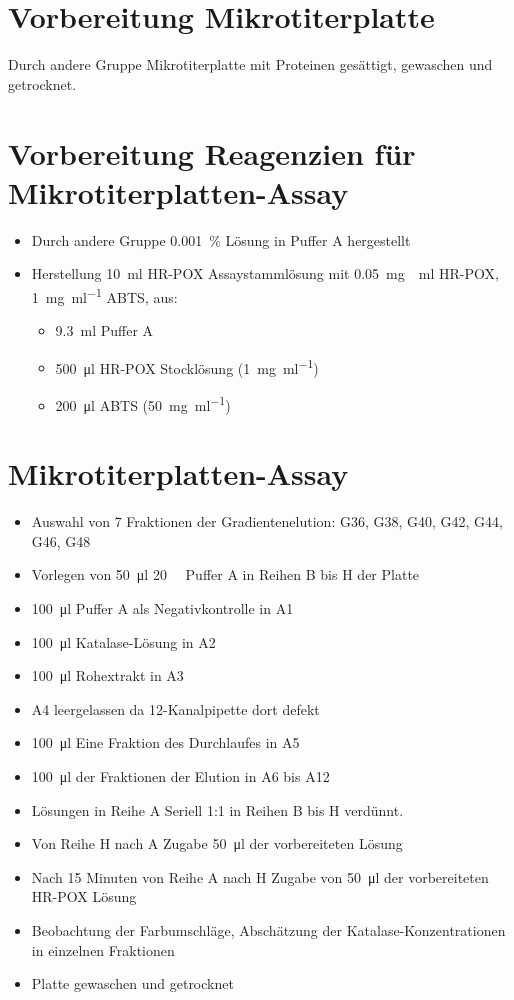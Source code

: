 \documentclass[a4paper,german]{scrreprt}
\begin{document}
\section{Vorbereitung Mikrotiterplatte}

Durch andere Gruppe Mikrotiterplatte mit Proteinen gesättigt, gewaschen und
getrocknet.

\section{Vorbereitung Reagenzien für Mikrotiterplatten-Assay}

\begin{itemize}
	\item Durch andere Gruppe \SI{0.001}{\percent}  Lösung in Puffer A hergestellt
	\item Herstellung \SI{10}{ml} HR-POX Assaystammlösung mit \SI{0.05}{\mg
		\per \ml} HR-POX, \SI{1}{\mg \per \ml} ABTS, aus:
		\begin{itemize}
			\item \SI{9.3}{\ml} Puffer A
			\item \SI{500}{\ul} HR-POX Stocklösung (\SI{1}{\mg \per \ml})
			\item \SI{200}{\ul} ABTS (\SI{50}{\mg \per \ml})
		\end{itemize}
\end{itemize}

\section{Mikrotiterplatten-Assay}

\begin{itemize}
	\item Auswahl von 7 Fraktionen der Gradientenelution: G36, G38, G40,
		G42, G44, G46, G48
	\item Vorlegen von \SI{50}{\ul} \SI{20}{\milli\Molar} Puffer A in
		Reihen B bis H der Platte
	\item \SI{100}{\ul} Puffer A als Negativkontrolle in A1
	\item \SI{100}{\ul} Katalase-Lösung in A2
	\item \SI{100}{\ul} Rohextrakt in A3
	\item A4 leergelassen da 12-Kanalpipette dort defekt
	\item \SI{100}{\ul} Eine Fraktion des Durchlaufes in A5
	\item \SI{100}{\ul} der Fraktionen der Elution in A6 bis A12
	\item Lösungen in Reihe A Seriell 1:1 in Reihen B bis H verdünnt.
	\item Von Reihe H nach A Zugabe \SI{50}{\ul} der vorbereiteten
		 Lösung
	\item Nach 15 Minuten von Reihe A nach H Zugabe von \SI{50}{\ul} der
		vorbereiteten HR-POX Lösung
	\item Beobachtung der Farbumschläge, Abschätzung der
		Katalase-Konzentrationen in einzelnen Fraktionen
	\item Platte gewaschen und getrocknet
\end{itemize}
\end{document}
